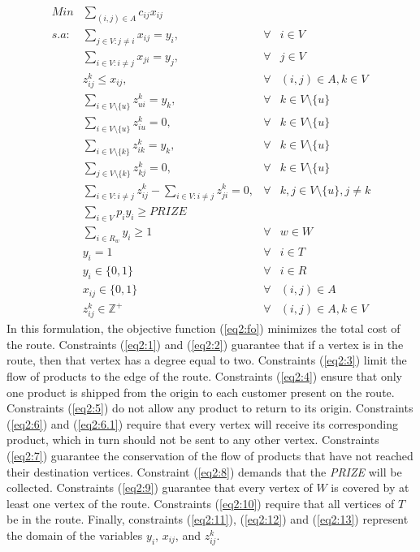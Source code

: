 \documentclass{ro}
\begin{document}
{\small
	\begin{align}
	Min &\sum_{(i,j) \in A} c_{ij} x_{ij} \label{eq2:fo}\\
	s.a:&\sum_{j \in V : j \neq i} x_{ij} = y_i,      &\forall& i \in V \label{eq2:1}\\
	&\sum_{i \in V : i \neq j} x_{ji} = y_j,	          &\forall& j \in V \label{eq2:2}\\
	&z_{ij}^k \leq x_{ij},							  &\forall& (i,j) \in A,k \in V \label{eq2:3}\\
	&\sum_{i \in V \setminus \{u\}} z_{ui}^k = y_k,					  &\forall& k \in V \setminus\{u\} \label{eq2:4}\\
	&\sum_{i \in V \setminus \{u\}} z_{iu}^k = 0,					  &\forall& k \in V \setminus\{u\} \label{eq2:5} \\ 
	&\sum_{i \in V \setminus \{k\}} z_{ik}^k = y_k,				  &\forall& k \in V \setminus\{u\} \label{eq2:6}\\
	&\sum_{j \in V \setminus \{k\}} z_{kj}^k = 0,					  &\forall& k \in V \setminus\{u\}  \label{eq2:6.1}\\
	&\sum_{i \in V: i\neq j} z_{ij}^k - \sum_{i \in V : i\neq j} z_{ji}^k = 0,     &\forall& k,j \in V \setminus\{u\}, j \neq k \label{eq2:7}\\
	&\sum_{ i \in V} p_i y_i \geq PRIZE\label{eq2:8} \\
	&\sum_{i \in R_w} y_i \geq 1			&\forall& w \in W \label{eq2:9}\\
	&y_i = 1			&\forall& i \in T \label{eq2:10}\\
	&y_i \in \{0,1\}		&\forall& i \in R \label{eq2:11}\\
	&x_{ij} \in \{0,1\} 		&\forall& (i,j) \in A \label{eq2:12}\\
	&z_{ij}^k \in \mathbb{Z}^+		&\forall& (i,j) \in A,k \in V \label{eq2:13}
	\end{align}
}
In this formulation, the objective function (\ref{eq2:fo}) minimizes the total cost of the route. Constraints (\ref{eq2:1}) and (\ref{eq2:2}) guarantee that if a vertex is in the route, then that vertex has a degree equal to two. Constraints (\ref{eq2:3}) limit the flow of products to the edge of the route. Constraints (\ref{eq2:4}) ensure that only one product is shipped from the origin to each customer present on the route. Constraints (\ref{eq2:5}) do not allow any product to return to its origin. Constraints (\ref{eq2:6}) and (\ref{eq2:6.1}) require that every vertex will receive its corresponding product, which in turn should not be sent to any other vertex. Constraints (\ref{eq2:7}) guarantee the conservation of the flow of products that have not reached their destination vertices. Constraint (\ref{eq2:8}) demands that the \textit{PRIZE} will be collected. Constraints (\ref{eq2:9}) guarantee that every vertex of $W$ is covered by at least one vertex of the route. Constraints (\ref{eq2:10}) require that all vertices of $T$ be in the route. Finally, constraints (\ref{eq2:11}), (\ref{eq2:12}) and (\ref{eq2:13}) represent the domain of the variables $y_i$, $x_{ij}$, and $z_{ij}^k$.
\end{document}
